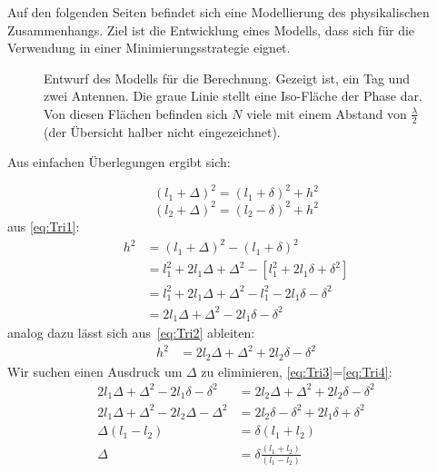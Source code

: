 Auf den folgenden Seiten befindet sich eine Modellierung des physikalischen Zusammenhangs. Ziel ist die Entwicklung eines Modells, dass sich für die Verwendung in einer Minimierungsstrategie eignet.
\begin{figure}[h]
	\begin{center}
		
		 \caption[Kurzeintrag]{Entwurf des Modells für die Berechnung. Gezeigt ist, ein Tag und zwei Antennen. Die graue Linie stellt eine Iso-Fläche der Phase dar. Von diesen Flächen befinden sich $N$ viele mit einem Abstand von $\frac{\lambda}{2}$ (der Übersicht halber nicht eingezeichnet).} 
	\end{center}
\end{figure}

Aus einfachen Überlegungen ergibt sich:

\begin{equation}\label{eq:Tri1}
(l_1+\Delta)^2 = (l_1+\delta)^2+h^2
\end{equation}
\begin{equation}\label{eq:Tri2}
(l_2+\Delta)^2 = (l_2-\delta)^2+h^2
\end{equation}
%
aus \eqref{eq:Tri1}:
\begin{align}
h^2 &= (l_1+\Delta)^2 - (l_1+\delta)^2\\
	&= l_1^2 + 2l_1\Delta + \Delta^2 -[ l_1^2 + 2 l_1 \delta + \delta^2]\nonumber\\
	&= l_1^2 + 2l_1\Delta + \Delta^2 - l_1^2 - 2 l_1 \delta - \delta^2	\nonumber\\
	&= 2l_1\Delta + \Delta^2 - 2 l_1 \delta - \delta^2 \label{eq:Tri3}
\end{align}
%
analog dazu lässt sich aus~\eqref{eq:Tri2} ableiten:
%
\begin{align}
h^2 &= 2l_2\Delta + \Delta^2 + 2 l_2 \delta - \delta^2 \label{eq:Tri4}
\end{align}
%
Wir suchen einen Ausdruck um $\Delta$ zu eliminieren, \eqref{eq:Tri3}=\eqref{eq:Tri4}:
%
\begin{align}
	2l_1\Delta + \Delta^2 - 2 l_1 \delta - \delta^2 &=  2l_2\Delta + \Delta^2 + 2 l_2 \delta - \delta^2 \nonumber \\
	2l_1\Delta + \Delta^2 - 2l_2\Delta - \Delta^2&= 2 l_2 \delta - \delta^2 +2l_1\delta +\delta^2 \nonumber \\
	\Delta(l_1 - l_2  ) &= \delta (l_1+l_2) \nonumber \\
	\Delta &= \delta\frac{(l_1 + l_2)}{(l_1 - l_2)} \label{eq:Tri5}
\end{align}

